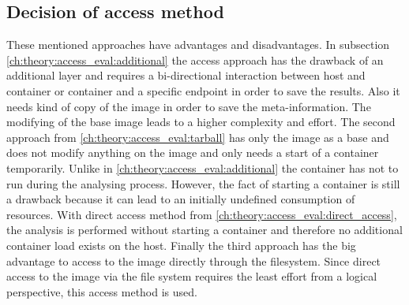 \subsection{Decision of access method} 
\label{ch:theory:access_eval:decision_access}
These mentioned approaches have advantages and disadvantages. 	
In subsection \ref{ch:theory:access_eval:additional} the access approach has the drawback of an additional layer and requires a bi-directional interaction between host and container or container and a specific endpoint in order to save the results. Also it needs kind of copy of the image in order to save the meta-information. The modifying of the base image leads to a higher complexity and effort. 
The second approach from \ref{ch:theory:access_eval:tarball} has only the image as a base and does not modify anything on the image and only needs a start of a container temporarily. Unlike in \ref{ch:theory:access_eval:additional} the container has not to run during the analysing process. However, the fact of starting a container is still a drawback because it can lead to an initially undefined consumption of resources.
With direct access method from \ref{ch:theory:access_eval:direct_access}, the analysis is performed without starting a container and therefore no additional container load exists on the host.
Finally the third approach has the big advantage to access to the image directly through the filesystem. 
Since direct access to the image via the file system requires the least effort from a logical perspective, this access method is used.